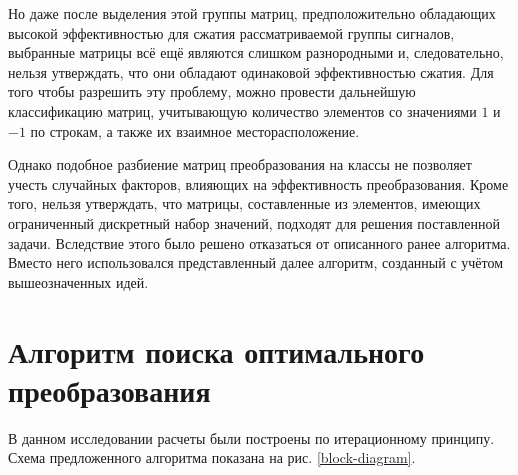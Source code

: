 \documentclass[11pt, oneside, a4paper]{article}
\begin{document}
Но даже после выделения этой группы матриц, предположительно обладающих высокой эффективностью для сжатия рассматриваемой группы сигналов, выбранные матрицы всё ещё являются слишком разнородными и, следовательно, нельзя утверждать, что они обладают одинаковой эффективностью сжатия. Для того чтобы разрешить эту проблему, можно провести дальнейшую классификацию матриц, учитывающую количество элементов со значениями $1$ и $-1$ по строкам, а также их взаимное месторасположение. 

Однако подобное разбиение матриц преобразования на классы не позволяет учесть случайных факторов, влияющих на эффективность преобразования. Кроме того, нельзя утверждать, что матрицы, составленные из элементов, имеющих ограниченный дискретный набор значений, подходят для решения поставленной задачи. Вследствие этого было решено отказаться от описанного ранее алгоритма. Вместо него использовался представленный далее алгоритм, созданный с учётом вышеозначенных идей.

\section{Алгоритм поиска оптимального преобразования}

В данном исследовании расчеты были построены по итерационному принципу. Схема предложенного алгоритма показана на рис. \ref{block-diagram}.
\end{document}
